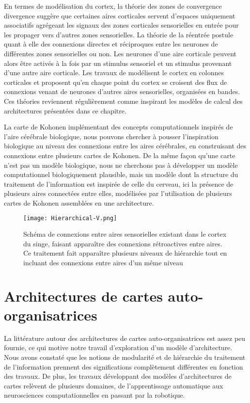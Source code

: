 \documentclass[../main]{subfiles}
\begin{document}
En termes de modélisation du cortex, la théorie des zones de convergence divergence \parencite{damasio_time-locked_1989} suggère que certaines aires corticales servent d'espaces uniquement associatifs agrégeant les signaux des zones corticales sensorielles en entrée pour les propager vers d'autres zones sensorielles. 
La théorie de la réentrée \parencite{Edelman1982GroupSA} postule quant à elle des connexions directes et réciproques entre les neurones de différentes zones sensorielles ou non. Les neurones d'une aire corticale peuvent alors être activés à la fois par un stimulus sensoriel et un stimulus provenant d'une autre aire corticale.
Les travaux de \cite{Burnod1989AnAN} modélisent le cortex en colonnes corticales et proposent qu'en chaque point du cortex se croisent des flux de connexions venant de neurones d'autres aires sensorielles, organisées en bandes. Ces théories reviennent régulièrement comme inspirant les modèles de calcul des architectures présentées dans ce chapitre.

La carte de Kohonen implémentant des concepts computationnels inspirés de l'aire cérébrale biologique, nous pouvons chercher à pousser l'inspiration biologique au niveau des connexions entre les aires cérébrales, en construisant des connexions entre plusieurs cartes de Kohonen.
De la même façon qu'une carte n'est pas un modèle biologique, nous ne cherchons pas à développer un modèle computationnel biologiquement plausible, mais un modèle dont la structure du traitement de l'information est inspirée de celle du cerveau, ici la présence de plusieurs aires connectées entre elles, modélisées par l'utilisation de plusieurs cartes de Kohonen assemblées en une architecture.

\begin{figure}
    \centering
    \texttt{[image: Hierarchical-V.png]}
    \caption{Schéma de connexions entre aires sensorielles existant dans le cortex du singe, faisant apparaître des connexions rétroactives entre aires. Ce traitement fait apparaître plusieurs niveaux de hiérarchie tout en incluant des connexions entre aires d'un même niveau \parencite{primate_cortex_91}\label{fig:primate}}
\end{figure}


\section{Architectures de cartes auto-organisatrices}

La littérature autour des architectures de cartes auto-organisatrices est assez peu fournie, ce qui motive notre travail d'exploration d'un modèle d'architecture. 
Nous avons constaté que les notions de modularité et de hiérarchie du traitement de l'information prennent des significations complètement différentes en fonction des travaux. De plus, les travaux développant des modèles d'architectures de cartes relèvent de plusieurs domaines, de l'apprentissage automatique aux neurosciences computationnelles en passant par la robotique.
\end{document}
